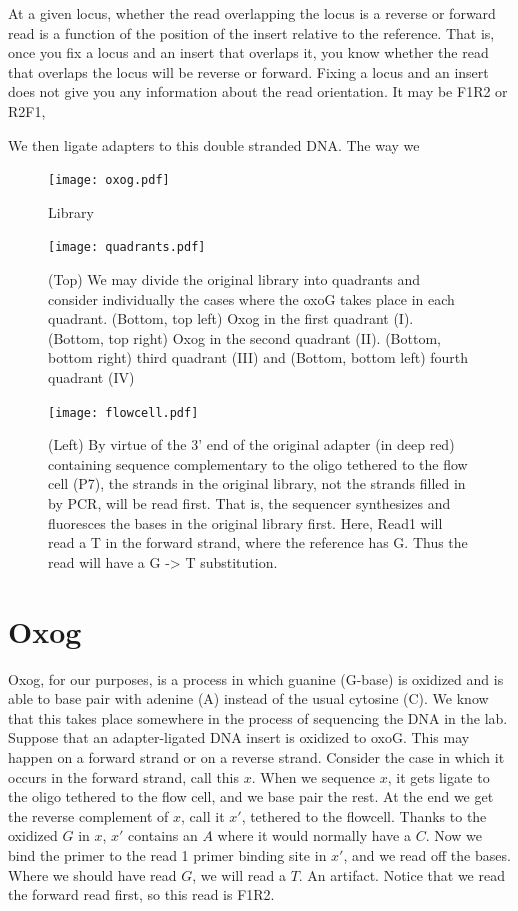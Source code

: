 \documentclass[a4paper]{article}
\begin{document}
At a given locus, whether the read overlapping the locus is a reverse or forward read is a function of the position of the insert relative to the reference. That is, once you fix a locus and an insert that overlaps it, you know whether the read that overlaps the locus will be reverse or forward. Fixing a locus and an insert does not give you any information about the read orientation. It may be F1R2 or R2F1, 

We then ligate adapters to this double stranded DNA. The way we 


\begin{figure}
  \texttt{[image: oxog.pdf]}
  \caption{Library }
  \label{fig:oxog}
\end{figure}


\begin{figure}
  \texttt{[image: quadrants.pdf]}
  \caption{(Top) We may divide the original library into quadrants and consider individually the cases where the oxoG takes place in each quadrant. (Bottom, top left) Oxog in the first quadrant (I). (Bottom, top right) Oxog in the second quadrant (II). (Bottom, bottom right) third quadrant (III) and (Bottom, bottom left) fourth quadrant (IV) }
  \label{fig:quadrants}
\end{figure}

\begin{figure}
  \texttt{[image: flowcell.pdf]}
  \caption{(Left) By virtue of the 3' end of the original adapter (in deep red) containing sequence complementary to the oligo tethered to the flow cell (P7), the strands in the original library, not the strands filled in by PCR, will be read first. That is, the sequencer synthesizes and fluoresces the bases in the original library first. Here, Read1 will read a T in the forward strand, where the reference has G. Thus the read will have a G -> T substitution. }
  \label{fig:flowcell}
\end{figure}


\section{Oxog}

Oxog, for our purposes, is a process in which guanine (G-base) is oxidized and is able to base pair with adenine (A) instead of the usual cytosine (C). We know that this takes place somewhere in the process of sequencing the DNA in the lab. Suppose that an adapter-ligated DNA insert is oxidized to oxoG. This may happen on a forward strand or on a reverse strand. Consider the case in which it occurs in the forward strand, call this $x$. When we sequence $x$, it gets ligate to the oligo tethered to the flow cell, and we base pair the rest. At the end we get the reverse complement of $x$, call it $x'$, tethered to the flowcell. Thanks to the oxidized $G$ in $x$, $x'$ contains an $A$ where it would normally have a $C$. Now we bind the primer to the read 1 primer binding site in $x'$, and we read off the bases. Where we should have read $G$, we will read a $T$. An artifact. Notice that we read the forward read first, so this read is F1R2.
\end{document}
